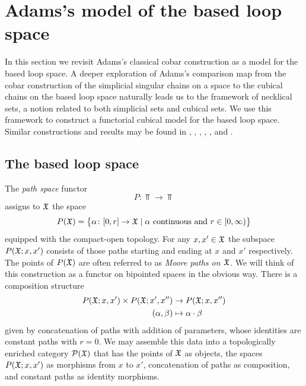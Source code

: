 
\section{Adams's model of the based loop space}\label{s:theorem1}

In this section we revisit Adams's classical cobar construction as a model for the based loop space.
A deeper exploration of Adams's comparison map from the cobar construction of the simplicial singular chains on a space to the cubical chains on the based loop space naturally leads us to the framework of necklical sets, a notion related to both simplicial sets and cubical sets.
We use this framework to construct a functorial cubical model for the based loop space.
Similar constructions and results may be found in \cite{baues1980geometry}, \cite{berger1995loops}, \cite{baues1998hopf}, \cite{dugger2011rigidification}, \cite{galvez2020hopf}, and \cite{rivera2018cubical, rivera2019path}.

\subsection{The based loop space}

The \textit{path space} functor
\[
P \colon \Top \to \Top
\]
assigns to $\mathfrak{X}$ the space
\[
P(\mathfrak{X}) = \big\{\alpha \colon [0,r] \to \mathfrak{X} \mid \text{$\alpha$ continuous and } r \in [0,\infty)\big\}
\]
equipped with the compact-open topology.
For any $x,x' \in \mathfrak{X}$ the subspace $P(\mathfrak{X};x,x')$ consists of those paths starting and ending at $x$ and $x'$ respectively. The points of $P(\mathfrak{X})$ are often referred to as \textit{Moore paths on $\mathfrak{X}$}. 
We will think of this construction as a functor on bipointed spaces in the obvious way.
There is a composition structure
\begin{equation}\label{eq:composition structure}
	\begin{split}
		P(\mathfrak{X};x,x') \times P(\mathfrak{X};x',x'') &\to P(\mathfrak{X};x,x'') \\
		(\alpha, \beta) &\mapsto \alpha \cdot \beta
	\end{split}
\end{equation}
given by concatenation of paths with addition of parameters, whose identities are constant paths with $r=0$.
We may assemble this data into a topologically enriched category $\mathcal{P}(\mathfrak{X})$ that has the points of $\mathfrak{X}$ as objects, the spaces $P(\mathfrak{X};x,x')$ as morphisms from $x$ to $x'$, concatenation of paths as composition, and constant paths as identity morphisms.

